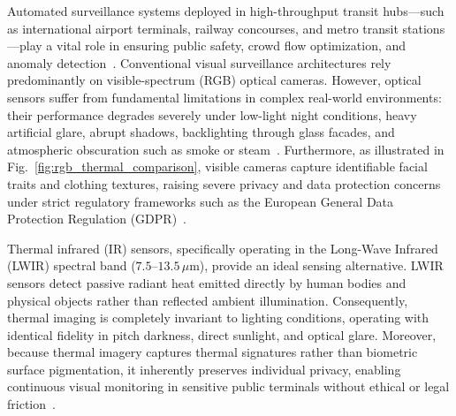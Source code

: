 \documentclass[journal,twoside,web]{ieeecolor}
\begin{document}
Automated surveillance systems deployed in high-throughput transit hubs---such as international airport terminals, railway concourses, and metro transit stations---play a vital role in ensuring public safety, crowd flow optimization, and anomaly detection~\cite{wilson2023recent,zhang2020traffic}. Conventional visual surveillance architectures rely predominantly on visible-spectrum (RGB) optical cameras. However, optical sensors suffer from fundamental limitations in complex real-world environments: their performance degrades severely under low-light night conditions, heavy artificial glare, abrupt shadows, backlighting through glass facades, and atmospheric obscuration such as smoke or steam~\cite{altay2022use}. Furthermore, as illustrated in Fig.~\ref{fig:rgb_thermal_comparison}, visible cameras capture identifiable facial traits and clothing textures, raising severe privacy and data protection concerns under strict regulatory frameworks such as the European General Data Protection Regulation (GDPR)~\cite{breland2021robust,guan2018daily}.

Thermal infrared (IR) sensors, specifically operating in the Long-Wave Infrared (LWIR) spectral band ($7.5\text{--}13.5\,\mu\text{m}$), provide an ideal sensing alternative. LWIR sensors detect passive radiant heat emitted directly by human bodies and physical objects rather than reflected ambient illumination. Consequently, thermal imaging is completely invariant to lighting conditions, operating with identical fidelity in pitch darkness, direct sunlight, and optical glare. Moreover, because thermal imagery captures thermal signatures rather than biometric surface pigmentation, it inherently preserves individual privacy, enabling continuous visual monitoring in sensitive public terminals without ethical or legal friction~\cite{wilson2023recent}.
\end{document}
